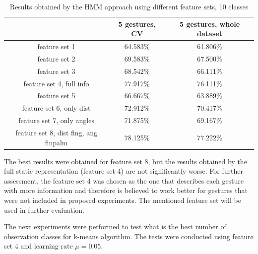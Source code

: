 \begin{table}[htp!]
	\label{tab:dyn1}
	\caption{Results obtained by the HMM approach using different feature sets, 10 classes}
    \begin{tabular}{|c|c|c|}
    \hline
    ~                                 & 5 gestures, CV & 5 gestures, whole dataset  \\ \hline
    feature set 1                     & 64.583\% & 61.806\%   \\ \hline
    feature set 2                     & 69.583\% & 67.500\%   \\ \hline
    feature set 3                     & 68.542\% & 66.111\%   \\ \hline
    feature set 4, full info          & 77.917\% & 76.111\%   \\ \hline
    feature set 5                     & 66.667\% & 63.889\%   \\ \hline
    feature set 6, only dist          & 72.912\% & 70.417\%   \\ \hline
    feature set 7, only angles        & 71.875\% & 69.167\%   \\ \hline
    feature set 8, dist fing, ang finpalm        & 78.125\% & 77.222\%   \\ \hline
    \end{tabular}
\end{table}
  
The best results were obtained for feature set $8$, but the results obtained by the full static representation (feature set 4) are not significantly worse.
For further assessment, the feature set 4 was chosen as the one that describes each gesture with more information and therefore is believed to work better for gestures that were not included in proposed experiments.
The mentioned feature set will be used in further evaluation.


The next experiments were performed to test what is the best number of observation classes for k-means algorithm. 
The tests were conducted using feature set $4$ and learning rate $\mu=0.05$.

